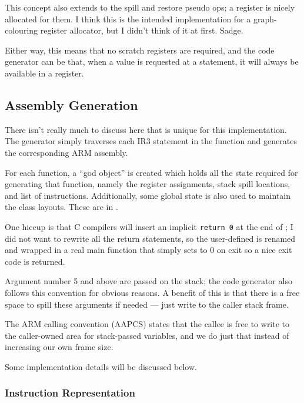 \documentclass[12pt]{article}
\begin{document}
This concept also extends to the spill and restore pseudo ops; a register is nicely allocated for them. I think this is the
intended implementation for a graph-colouring register allocator, but I didn't think of it at first. Sadge.

Either way, this means that no scratch registers are required, and the code generator can be  that, when a value
is requested at a statement, it will always be available in a register.




\subsection{Assembly Generation}

There isn't really much to discuss here that is unique for this implementation. The generator simply traverses each IR3 statement
in the function and generates the corresponding ARM assembly.

For each function, a \enquote{god object} is created which holds all the state required for generating that function, namely
the register assignments, stack spill locations, and list of instructions. Additionally, some global state is also used
to maintain the class layouts. These are in .

One hiccup is that C compilers will insert an implicit \texttt{return 0} at the end of ; I did not want to
rewrite all the return statements, so the user-defined  is renamed and wrapped in a real main function that
simply sets  to 0 on exit so a nice exit code is returned.

Argument number 5 and above are passed on the stack; the code generator also follows this convention for obvious reasons. A
benefit of this is that there is a free space to spill these arguments if needed --- just write to the caller stack frame.

The ARM calling convention (AAPCS) states that the callee is free to write to the caller-owned area for stack-passed
variables, and we do just that instead of increasing our own frame size.

Some implementation details will be discussed below.




\subsubsection{Instruction Representation}
\end{document}
